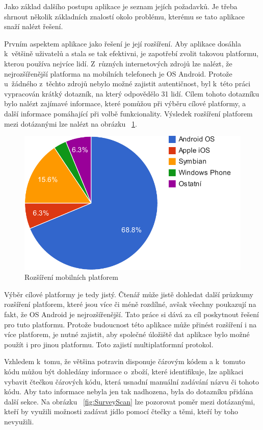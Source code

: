 \documentclass[thesis=B,czech]{FITthesis}[2013/10/20]
\begin{document}
Jako základ dalšího postupu aplikace je seznam jejích požadavků. Je třeba shrnout několik základních znalostí okolo problému, kterému se tato aplikace snaží nalézt řešení.

Prvním aspektem aplikace jako řešení je její rozšíření. Aby aplikace dosáhla k~většině uživatelů a stala se tak efektivni, je zapotřebí zvolit takovou platformu, kterou používa nejvíce lidí. Z~různých internetových zdrojů lze nalézt, že nejrozšířenější platforma na mobilních telefonech je OS Android. Protože u~žádného z~těchto zdrojů nebylo možné zajistit autentičnost, byl k~této práci vypracován krátký dotazník, na který odpovědělo 31 lidí. Cílem tohoto dotazníku bylo nalézt zajímavé informace, které pomůžou při výběru cílové platformy, a další informace pomáhající při volbě funkcionality. Výsledek rozšíření platforem mezi dotázanými lze nalézt na obrázku ~\ref{fig:SurveyOS}.

\begin{figure}[H]
  \centering
  \includegraphics[scale=0.8]{charts/survey_os}
  \caption{Rozšíření mobilních platforem}
  \label{fig:SurveyOS}
\end{figure}

Výběr cílové platformy je tedy jistý. Čtenář může jistě dohledat další průzkumy rozšíření platforem, které jsou více či méně rozdílné, avšak všechny poukazují na fakt, že OS Android je nejrozšířenější. Tato práce si dává za cíl poskytnout řešení pro tuto platformu. Protože budoucnost této aplikace může přinést rozšíření i na více platforem, je nutné zajistit, aby společné úložiště dat aplikace bylo možné použít i pro jinou platformu. Toto zajistí multiplatformní protokol.

Vzhledem k~tomu, že většina potravin disponuje čárovým kódem a k~tomuto kódu můžou být dohledány informace o~zboží, které identifikuje, lze aplikaci vybavit čtečkou čárových kódu, která usnadní manuální zadávání názvu či tohoto kódu. Aby tato informace nebyla jen tak nadhozena, byla do dotazníku přidána další sekce. Na obrázku ~\ref{fig:SurveyScan} lze pozorovat poměr mezi dotázanými, kteří by využili možnosti zadávat jídlo pomocí čtečky a těmi, kteří by toho nevyužili.
\end{document}
